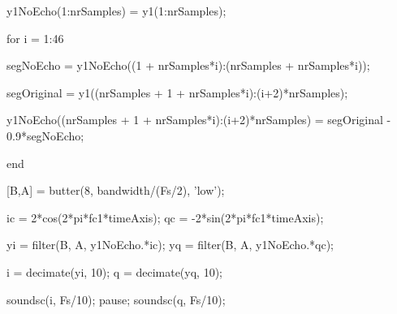 \documentclass[10pt,twocolumn]{article}
\begin{document}
\begin{spverbatim}
y1NoEcho(1:nrSamples) = y1(1:nrSamples);

for i = 1:46

    segNoEcho = y1NoEcho((1 + nrSamples*i):(nrSamples + nrSamples*i));  

    segOriginal = y1((nrSamples + 1 + nrSamples*i):(i+2)*nrSamples);          
    
    y1NoEcho((nrSamples + 1 + nrSamples*i):(i+2)*nrSamples) 
    							= segOriginal - 0.9*segNoEcho;  

end

[B,A] = butter(8, bandwidth/(Fs/2), 'low');

ic = 2*cos(2*pi*fc1*timeAxis);
qc = -2*sin(2*pi*fc1*timeAxis);

yi = filter(B, A, y1NoEcho.*ic);
yq = filter(B, A, y1NoEcho.*qc);

i = decimate(yi, 10);
q = decimate(yq, 10);

soundsc(i, Fs/10);  %
pause;
soundsc(q, Fs/10);  %


\end{spverbatim}
\end{document}
